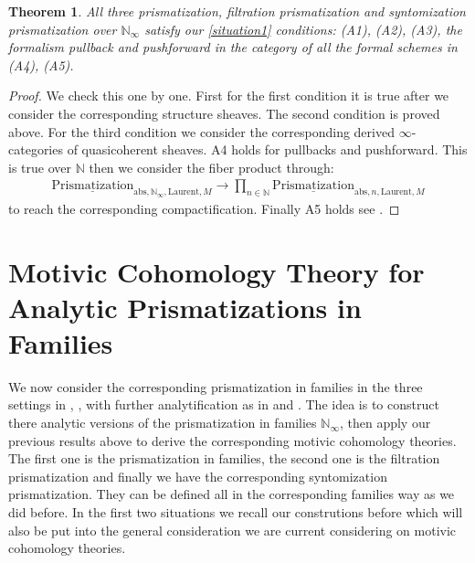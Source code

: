 \documentclass[12pt]{article}
\newtheorem{theorem}{Theorem}
\theoremstyle{definition}
\begin{document}
\begin{theorem}
All three prismatization, filtration prismatization and syntomization prismatization over $\mathbb{N}_\infty$ satisfy our \cref{situation1} conditions: (A1), (A2), (A3), the formalism pullback and pushforward in the category of all the formal schemes in (A4), (A5).
\end{theorem}


\begin{proof}
We check this one by one. First for the first condition it is true after we consider the corresponding structure sheaves. The second condition is proved above. For the third condition we consider the corresponding derived $\infty$-categories of quasicoherent sheaves. A4 holds for pullbacks and pushforward. This is true over $\mathbb{N}$ then we consider the fiber product through:
\begin{align}
{\underline{\mathrm{Prismatization}}}_{\mathrm{abs},\mathbb{N}_\infty,\mathrm{Laurent},M}\rightarrow  \prod_{n\in \mathbb{N}} {\underline{\mathrm{Prismatization}}}_{\mathrm{abs},n,\mathrm{Laurent},M}
\end{align}
to reach the corresponding compactification. Finally A5 holds see \cite[Chapter 4, in particular 4.7, 4.8, 4.9, 4.10]{3A}.
\end{proof}







\newpage
\section{Motivic Cohomology Theory for Analytic Prismatizations in Families}\label{section10}


\indent We now consider the corresponding prismatization in families in the three settings in \cite{3BL}, \cite{3D}, with further analytification as in \cite{3ALBRCS} and \cite{3S1}. The idea is to construct there analytic versions of the prismatization in families $\mathbb{N}_\infty$, then apply our previous results above to derive the corresponding motivic cohomology theories. The first one is the prismatization in families, the second one is the filtration prismatization and finally we have the corresponding syntomization prismatization. They can be defined all in the corresponding families way as we did before. In the first two situations we recall our construtions before which will also be put into the general consideration we are current considering on motivic cohomology theories.
\end{document}
